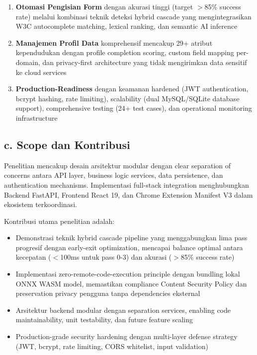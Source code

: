 \documentclass[12pt,a4paper]{article}
\begin{document}
\begin{enumerate}
  \item \textbf{Otomasi Pengisian Form} dengan akurasi tinggi (target $>$85\% success rate) melalui kombinasi teknik deteksi hybrid cascade yang mengintegrasikan W3C autocomplete matching, lexical ranking, dan semantic AI inference
  
  \item \textbf{Manajemen Profil Data} komprehensif mencakup 29+ atribut kependudukan dengan profile completion scoring, custom field mapping per-domain, dan privacy-first architecture yang tidak mengirimkan data sensitif ke cloud services
  
  \item \textbf{Production-Readiness} dengan keamanan hardened (JWT authentication, bcrypt hashing, rate limiting), scalability (dual MySQL/SQLite database support), comprehensive testing (24+ test cases), dan operational monitoring infrastructure
\end{enumerate}

\subsection*{c. Scope dan Kontribusi}

Penelitian mencakup desain arsitektur modular dengan clear separation of concerns antara API layer, business logic services, data persistence, dan authentication mechanisms. Implementasi full-stack integration menghubungkan Backend FastAPI, Frontend React 19, dan Chrome Extension Manifest V3 dalam ekosistem terkoordinasi.

Kontribusi utama penelitian adalah:

\begin{itemize}
  \item Demonstrasi teknik hybrid cascade pipeline yang menggabungkan lima pass progresif dengan early-exit optimization, mencapai balance optimal antara kecepatan ($<$100ms untuk pass 0-3) dan akurasi ($>$85\% success rate)
  
  \item Implementasi zero-remote-code-execution principle dengan bundling lokal ONNX WASM model, memastikan compliance Content Security Policy dan preservation privacy pengguna tanpa dependencies eksternal
  
  \item Arsitektur backend modular dengan separation services, enabling code maintainability, unit testability, dan future feature scaling
  
  \item Production-grade security hardening dengan multi-layer defense strategy (JWT, bcrypt, rate limiting, CORS whitelist, input validation)
\end{itemize}
\end{document}

